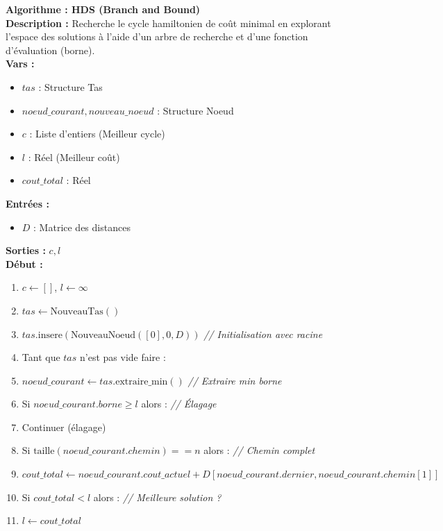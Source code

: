 \documentclass[a4paper, 12pt]{article}
\begin{document}
\begin{tcolorbox}[colback=darkWhite!75!white,colframe=black!30,left=5pt,right=5pt,top=5pt,bottom=5pt]
\textbf{Algorithme : HDS (Branch and Bound)} \\
\textbf{Description :} Recherche le cycle hamiltonien de coût minimal en explorant l'espace des solutions à l'aide d'un arbre de recherche et d'une fonction d'évaluation (borne). \\
\textbf{Vars :}
\begin{itemize}
    \item $tas$ : Structure Tas
    \item $noeud\_courant, nouveau\_noeud$ : Structure Noeud
    \item $c$ : Liste d'entiers (Meilleur cycle)
    \item $l$ : Réel (Meilleur coût)
    \item $cout\_total$ : Réel
\end{itemize}
\textbf{Entrées :}
\begin{itemize}
    \item $D$ : Matrice des distances
\end{itemize}
\textbf{Sorties :} $c, l$ \\
\textbf{Début :}
\begin{enumerate}
    \item $c \leftarrow []$, $l \leftarrow \infty$
    \item $tas \leftarrow \text{NouveauTas}()$
    \item $tas.\text{insere}(\text{NouveauNoeud}([0], 0, D))$ \textit{// Initialisation avec racine}
    \item Tant que $tas$ n'est pas vide faire :
    \item \quad $noeud\_courant \leftarrow tas.\text{extraire\_min}()$ \textit{// Extraire min borne}
    \item \quad Si $noeud\_courant.borne \geq l$ alors : \textit{// Élagage}
    \item \quad \quad Continuer (élagage)
    \item \quad Si $\text{taille}(noeud\_courant.chemin) == n$ alors : \textit{// Chemin complet}
    \item \quad \quad $cout\_total \leftarrow noeud\_courant.cout\_actuel + D[noeud\_courant.dernier, noeud\_courant.chemin[1]]$
    \item \quad \quad Si $cout\_total < l$ alors : \textit{// Meilleure solution ?}
    \item \quad \quad \quad $l \leftarrow cout\_total$

\end{enumerate}
\end{tcolorbox}
\end{document}
